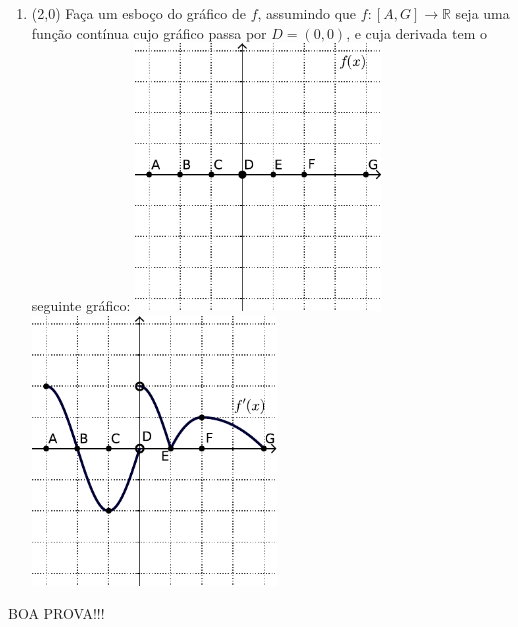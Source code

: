 \documentclass[12pt,a4paper]{article}
\newcommand*\R{\mathbb{R}}
\begin{document}
\begin{enumerate}
\item (2,0) Faça um esboço do gráfico de $f$, assumindo que $f: [A, G] \to \R$ seja uma função contínua cujo gráfico passa por $D=(0,0)$, e cuja derivada tem o seguinte gráfico:
\includegraphics[width=6.5cm]{img/prova-3-tads-derivada-malha} $\quad$
\includegraphics[width=6.5cm]{img/prova-3-tads-derivada.pdf}
\end{enumerate}

\begin{center}
BOA PROVA!!!
\end{center}

\newpage
\restoregeometry
\end{document}
